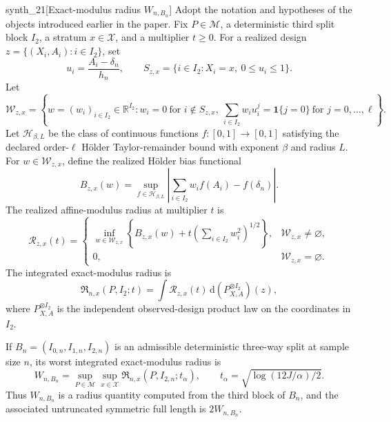 \begin{definitionv}{synth_21}[Exact-modulus radius \(W_{n,B_n}\)]
Adopt the notation and hypotheses of the objects introduced earlier in the paper.  Fix \(P\in\mathcal M\), a deterministic third split block \(I_2\), a stratum \(x\in\mathcal X\), and a multiplier \(t\geq0\).  For a realized design \(z=\{(X_i,A_i):i\in I_2\}\), set
\[
u_i=\frac{A_i-\delta_n}{h_n},
\qquad
S_{z,x}=\{i\in I_2:X_i=x,\ 0\leq u_i\leq1\}.
\]
Let
\[
\mathcal W_{z,x}
=
\left\{
w=(w_i)_{i\in I_2}\in\mathbb R^{I_2}:
w_i=0\ \text{for }i\notin S_{z,x},\
\sum_{i\in I_2}w_i u_i^j=\mathbf 1\{j=0\}\ \text{for }j=0,\ldots,\ell
\right\}.
\]
Let \(\mathcal H_{\beta,L}\) be the class of continuous functions \(f:[0,1]\to[0,1]\) satisfying the declared order-\(\ell\) Hölder Taylor-remainder bound with exponent \(\beta\) and radius \(L\).  For \(w\in\mathcal W_{z,x}\), define the realized Hölder bias functional
\[
B_{z,x}(w)
=
\sup_{f\in\mathcal H_{\beta,L}}
\left|
\sum_{i\in I_2}w_i f(A_i)-f(\delta_n)
\right|.
\]
The realized affine-modulus radius at multiplier \(t\) is
\[
\mathcal R_{z,x}(t)
=
\begin{cases}
\displaystyle
\inf_{w\in\mathcal W_{z,x}}
\left\{
B_{z,x}(w)
+
t\left(\sum_{i\in I_2}w_i^2\right)^{1/2}
\right\},
&\mathcal W_{z,x}\neq\varnothing,\\[1ex]
0,&\mathcal W_{z,x}=\varnothing.
\end{cases}
\]
The integrated exact-modulus radius is
\[
\mathfrak R_{n,x}(P,I_2;t)
=
\int
\mathcal R_{z,x}(t)\,
\mathrm d(P_{X,A}^{\otimes I_2})(z),
\]
where \(P_{X,A}^{\otimes I_2}\) is the independent observed-design product law on the coordinates in \(I_2\).

If \(B_n=(I_{0,n},I_{1,n},I_{2,n})\) is an admissible deterministic three-way split at sample size \(n\), its worst integrated exact-modulus radius is
\[
W_{n,B_n}
=
\sup_{P\in\mathcal M}\sup_{x\in\mathcal X}
\mathfrak R_{n,x}\!\left(P,I_{2,n};t_\alpha\right),
\qquad
t_\alpha=\sqrt{\log(12J/\alpha)/2}.
\]
Thus \(W_{n,B_n}\) is a radius quantity computed from the third block of \(B_n\), and the associated untruncated symmetric full length is \(2W_{n,B_n}\).
\end{definitionv}

